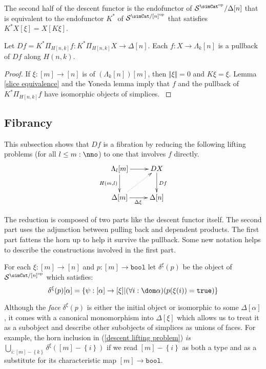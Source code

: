 \documentclass{tac}
\newcommand\cat\mathcal
\newcommand\set[1]{\left\{#1\right\}}
\newcommand\ri{^*}
\newcommand\dual{^{\mathrm{op}}}
\newcommand\s{^{\simCat\dual}}
\newcommand\of{:}
\newcommand\simplex\Delta
\newcommand\horn\Lambda
\newcommand\true{\mathtt{true}}
\newcommand\bool{\mathtt{bool}}
\newcommand\norm[1]{\Vert #1 \Vert}
\newcommand\depprod{\Pi_}
\newcommand\face\delta
\begin{document}
The second half of the descent functor is the endofunctor of $\cat S\s/\simplex[n]$ that is equivalent to the endofunctor $K\ri$ of $\cat S^{\simCat/[n]\dual}$ that satisfies $K\ri X[\xi] = X[K\xi]$.

\begin{lemma} Let $Df = K\ri\depprod{H[n,k]}f\of K\ri\depprod{H[n,k]}X\to\simplex[n]$. Each $f\of X\to\horn_k[n]$ is a pullback of $Df$ along $H(n,k)$. \end{lemma}

\begin{proof} If $\xi\of [m]\to[n]$ is of $(\horn_k[n])[m]$, then $\norm\xi=0$ and $K\xi = \xi$. Lemma \ref{slice equivalence} and the Yoneda lemma imply that $f$ and the pullback of $K\ri\depprod{H[n,k]}f$ have isomorphic objects of simplices. \label{descent pullback}
\end{proof}

\subsection{Fibrancy}
This subsection shows that $Df$ is a fibration by reducing the following lifting problems (for all $l\leq m\of\nno$) to one that involves $f$ directly.
\begin{equation}
	\xymatrix{
		\horn_l[m]\ar[r]\ar[d]_{H(m,l)} & DX\ar[d]^{Df} \\
		\simplex[m]\ar[r]_{\Delta\xi} \ar@{.>}[ur] & \simplex[n]
	}
	\label{descent lifting problem}
\end{equation}

The reduction is composed of two parts like the descent functor itself. The second part uses the adjunction between pulling back and dependent products. The first part fattens the horn up to help it survive the pullback. Some new notation helps to describe the constructions involved in the first part.


\begin{definition} For each $\xi\of[m]\to[n]$ and $p\of[m]\to\bool$ let $\face^\xi(p)$ be the object of $\cat S^{\simCat/[n]\dual}$ which satisfies: 
\[ \face^\xi(p)[\alpha] = \set{\psi\of [\alpha]\to[\xi] | (\forall i\of \dom\alpha)(p(\xi(i))=\true)} \]
\end{definition}

Although the \emph{face} $\face^\xi(p)$ is either the initial object or isomorphic to some $\simplex[\alpha]$, it comes with a canonical monomorphism into $\simplex[\xi]$ which allows us to treat it as a subobject and describe other subobjects of simplices as unions of faces. For example, the horn inclusion in (\ref{descent lifting problem}) \emph{is} $\bigcup_{i\of [m]-\set k} \face^\xi([m]-\set i)$ if we read $[m]-\set i$ as both a type and as a substitute for its characteristic map $[m]\to\bool$.
\end{document}
